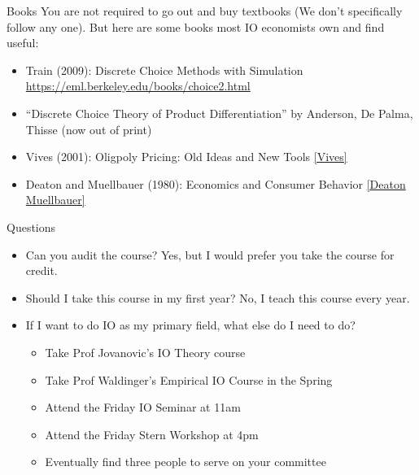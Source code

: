 \begin{frame}{Books}
You are not required to go out and buy textbooks (We don't specifically follow any one). But here are some books most IO economists own and find useful:
\begin{itemize}
    \item Train (2009): Discrete Choice Methods with Simulation \url{https://eml.berkeley.edu/books/choice2.html}
    \item ``Discrete Choice Theory of Product Differentiation'' by Anderson, De Palma, Thisse (now out of print)
    \item Vives (2001): Oligpoly Pricing: Old Ideas and New Tools \href{https://www.amazon.com/Oligopoly-Pricing-Old-Ideas-Tools/dp/026272040X}{[Vives]}
    \item Deaton and Muellbauer (1980): Economics and Consumer Behavior \href{https://www.amazon.com/Economics-Consumer-Behavior-Angus-Deaton/dp/0521296765}{[Deaton Muellbauer]}
\end{itemize}
\end{frame}

\begin{frame}{Questions}
\begin{itemize}
    \item Can you audit the course? Yes, but I would prefer you take the course for credit.
    \item Should I take this course in my first year? No, I teach this course every year.
    \item If I want to do IO as my primary field, what else do I need to do?
    \begin{itemize}
        \item Take Prof Jovanovic's IO Theory course
        \item Take Prof Waldinger's Empirical IO Course in the Spring
        \item Attend the Friday IO Seminar at 11am
        \item Attend the Friday Stern Workshop at 4pm
        \item Eventually find three people to serve on your committee
    \end{itemize}
\end{itemize}
\end{frame}




